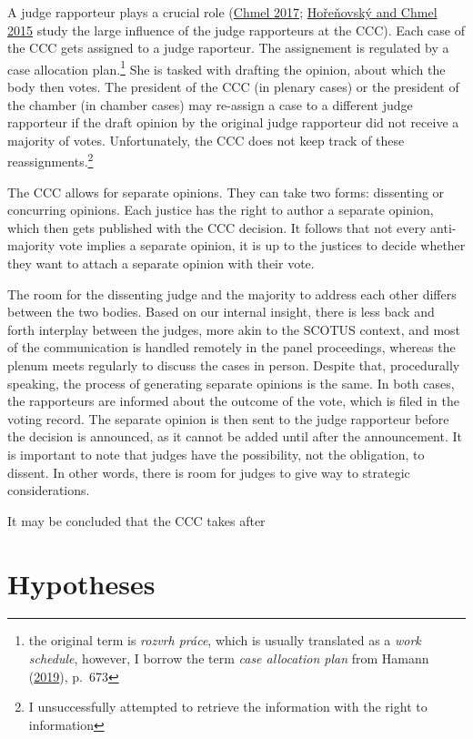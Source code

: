 \documentclass[
  11pt,
]{article}
\begin{document}
A judge rapporteur plays a crucial role
(\protect\hyperlink{ref-chmelZpravodajoveSenatyVliv2017}{Chmel 2017};
\protect\hyperlink{ref-horenovskyProcessMakingConstitutional2015}{Hořeňovský
and Chmel 2015} study the large influence of the judge rapporteurs at
the CCC). Each case of the CCC gets assigned to a judge raporteur. The
assignement is regulated by a case allocation plan.\footnote{the
  original term is \emph{rozvrh práce}, which is usually translated as a
  \emph{work schedule}, however, I borrow the term \emph{case allocation
  plan} from Hamann
  (\protect\hyperlink{ref-hamannGermanFederalCourts2019}{2019}), p.~673}
She is tasked with drafting the opinion, about which the body then
votes. The president of the CCC (in plenary cases) or the president of
the chamber (in chamber cases) may re-assign a case to a different judge
rapporteur if the draft opinion by the original judge rapporteur did not
receive a majority of votes. Unfortunately, the CCC does not keep track
of these reassignments.\footnote{I unsuccessfully attempted to retrieve
  the information with the right to information}

The CCC allows for separate opinions. They can take two forms:
dissenting or concurring opinions. Each justice has the right to author
a separate opinion, which then gets published with the CCC decision. It
follows that not every anti-majority vote implies a separate opinion, it
is up to the justices to decide whether they want to attach a separate
opinion with their vote.

The room for the dissenting judge and the majority to address each other
differs between the two bodies. Based on our internal insight, there is
less back and forth interplay between the judges, more akin to the
SCOTUS context, and most of the communication is handled remotely in the
panel proceedings, whereas the plenum meets regularly to discuss the
cases in person. Despite that, procedurally speaking, the process of
generating separate opinions is the same. In both cases, the rapporteurs
are informed about the outcome of the vote, which is filed in the voting
record. The separate opinion is then sent to the judge rapporteur before
the decision is announced, as it cannot be added until after the
announcement. It is important to note that judges have the possibility,
not the obligation, to dissent. In other words, there is room for judges
to give way to strategic considerations.

It may be concluded that the CCC takes after

\hypertarget{hypotheses}{%
\section{Hypotheses}\label{hypotheses}}
\end{document}
